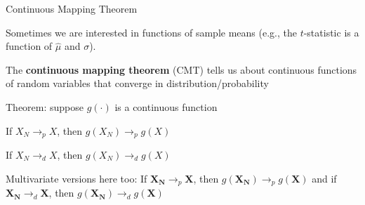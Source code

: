 \documentclass[11pt,english,handout]{beamer}
\newenvironment{wideitemize}{\itemize\addtolength{\itemsep}{10pt}}{\enditemize}
\begin{document}
\begin{frame}{Continuous Mapping Theorem}

\begin{wideitemize}	

\item
Sometimes we are interested in functions of sample means (e.g., the $t$-statistic is a function of $\hat\mu$ and $\sigma$).

\pause
\item
The \textbf{continuous mapping theorem} (CMT) tells us about continuous functions of random variables that converge in distribution/probability

\pause
\item
Theorem: suppose $g(\cdot)$ is a continuous function\\
\vspace{.2cm}

If $X_N \rightarrow_p X$, then $g(X_N) \rightarrow_p g(X)$ \\
\vspace{.2cm}
\pause

If $X_N \rightarrow_d X$, then $g(X_N) \rightarrow_d g(X)$\\
\vspace{0.2cm}
\pause{}

Multivariate versions here too: If $\mathbf{X_N} \rightarrow_p \mathbf{X}$, then $g(\mathbf{X_N}) \rightarrow_p g(\mathbf{X})$ and if $\mathbf{X_N} \rightarrow_d \mathbf{X}$, then $g(\mathbf{X_N}) \rightarrow_d g(\mathbf{X})$

\end{wideitemize}

\end{frame}
\end{document}
